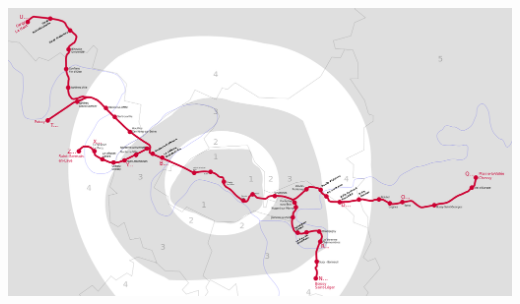\documentclass[table]{beamer}
\begin{document}
\begin{frame}
\begin{columns}
\begin{column}{0.3\linewidth}
      \includegraphics[width=\linewidth]{images/rer-a-map}      
    \end{column}
  \end{columns}
\end{frame}
\end{document}
